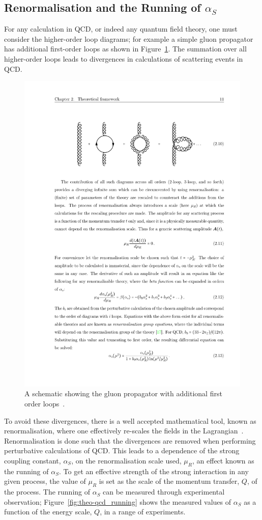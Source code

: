 \subsection{Renormalisation and the Running of $\alpha_S$}
\label{sec:theo-qcd_dijet_running}

For any calculation in QCD, or indeed any quantum field theory, one must consider the higher-order loop diagrams;
for example a simple gluon propagator has additional first-order loops as shown in Figure~\ref{fig:theo-qcd_gluon}.
The summation over all higher-order loops leads to divergences in calculations of scattering events in QCD.

\begin{figure}[!hbt]
  \begin{center}
    \includegraphics[width=0.5\linewidth, angle=0]{figs/Theory/qcd_gluon_loop.pdf}
  \end{center}
  \vspace{-1em}
  \caption[A schematic showing the gluon propagator with additional first order loops.]
  {A schematic showing the gluon propagator with additional first order loops~\cite{det-thesis_kate}.}
  \label{fig:theo-qcd_gluon}
\end{figure}

To avoid these divergences, there is a well accepted mathematical tool, known as renormalisation,
where one effectively re-scales the fields in the Lagrangian~\cite{obj-bjets_PDG}.
Renormalisation is done such that the divergences are removed
when performing perturbative calculations of QCD.
This leads to a dependence of the strong coupling constant, $\alpha_S$, on the renormalisation scale used, $\mu_R$,
an effect known as the running of $\alpha_S$.
To get an effective strength of the strong interaction in any given process,
the value of $\mu_R$ is set as the scale of the momentum transfer, $Q$, of the process.
The running of $\alpha_{S}$ can be measured through experimental observation;
Figure~\ref{fig:theo-qcd_running} shows the measured values of $\alpha_S$
as a function of the energy scale, $Q$, in a range of experiments.

